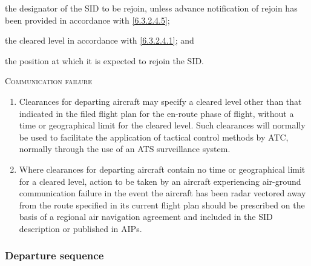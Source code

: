 \begin{enumeratesc}
\begin{enumerate}
        \begin{enumalph}
            \item the designator of the SID to be rejoin, unless advance notification of rejoin has been provided in accordance with \ref{6.3.2.4.5};
            \item the cleared level in accordance with \ref{6.3.2.4.1}; and
            \item the position at which it is expected to rejoin the SID.
        \end{enumalph}
        
        
    \end{enumerate}

    \item \textsc{Communication failure}
    \begin{enumerate}
        \item Clearances for departing aircraft may specify a cleared level other than that indicated in the filed flight plan for the en-route phase of flight, without a time or geographical limit for the cleared level. Such clearances will normally be used to facilitate the application of tactical control methods by ATC, normally through the use of an ATS surveillance system.
        \item Where clearances for departing aircraft contain no time or geographical limit for a cleared level, action to be taken by an aircraft experiencing air-ground communication failure in the event the aircraft has been radar vectored away from the route specified in its current flight plan should be prescribed on the basis of a regional air navigation agreement and included in the SID description or published in AIPs.
    \end{enumerate}
\end{enumeratesc}

\subsubsection{Departure sequence}

